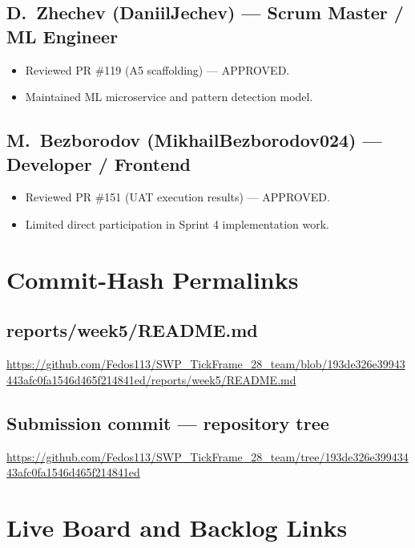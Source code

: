 \documentclass[11pt,a4paper]{article}
\begin{document}
\subsection{D.~Zhechev (DaniilJechev) --- Scrum Master / ML Engineer}
\begin{itemize}[leftmargin=*]
    \item Reviewed PR \#119 (A5 scaffolding) --- APPROVED.
    \item Maintained ML microservice and pattern detection model.
\end{itemize}

\subsection{M.~Bezborodov (MikhailBezborodov024) --- Developer / Frontend}
\begin{itemize}[leftmargin=*]
    \item Reviewed PR \#151 (UAT execution results) --- APPROVED.
    \item Limited direct participation in Sprint 4 implementation work.
\end{itemize}

\section{Commit-Hash Permalinks}

\subsection{reports/week5/README.md}
\url{https://github.com/Fedos113/SWP_TickFrame_28_team/blob/193de326e39943443afc0fa1546d465f214841ed/reports/week5/README.md}

\subsection{Submission commit --- repository tree}
\url{https://github.com/Fedos113/SWP_TickFrame_28_team/tree/193de326e39943443afc0fa1546d465f214841ed}

\section{Live Board and Backlog Links}
\end{document}
